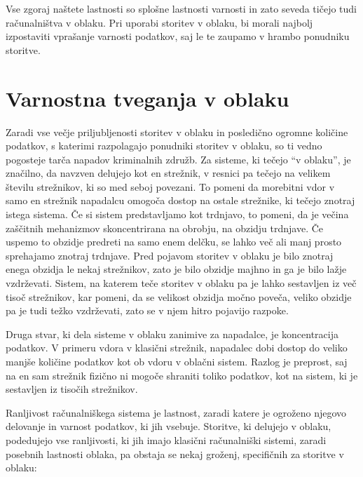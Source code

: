 \documentclass[12pt,a4paper,openany,tikz]{book}
\theoremstyle{plain}
\theoremstyle{definition}
\begin{document}
\noindent
Vse zgoraj naštete lastnosti so splošne lastnosti varnosti in zato seveda tičejo tudi računalništva v oblaku. Pri uporabi storitev v oblaku, bi morali najbolj izpostaviti vprašanje varnosti podatkov, saj le te zaupamo v hrambo ponudniku storitve.

\cleardoublepage
\chapter{Varnostna tveganja v oblaku}

Zaradi vse večje priljubljenosti storitev v oblaku in posledično ogromne količine podatkov, s katerimi razpolagajo ponudniki storitev v oblaku, so ti vedno pogosteje tarča napadov kriminalnih združb. Za sisteme, ki tečejo “v oblaku”, je značilno, da navzven delujejo kot en strežnik, v resnici pa tečejo na velikem številu strežnikov, ki so med seboj povezani. To pomeni da morebitni vdor v samo en strežnik napadalcu omogoča dostop na ostale strežnike, ki tečejo znotraj istega sistema. Če si sistem predstavljamo kot trdnjavo, to pomeni, da je večina zaščitnih mehanizmov skoncentrirana na obrobju, na obzidju trdnjave. Če uspemo to obzidje predreti na samo enem delčku, se lahko več ali manj prosto sprehajamo znotraj trdnjave. Pred pojavom storitev v oblaku je bilo znotraj enega obzidja le nekaj strežnikov, zato je bilo obzidje majhno in ga je bilo lažje vzdrževati. Sistem, na katerem teče storitev v oblaku pa je lahko sestavljen iz več tisoč strežnikov, kar pomeni, da se velikost obzidja močno poveča, veliko obzidje pa je tudi težko vzdrževati, zato se v njem hitro pojavijo razpoke.

Druga stvar, ki dela sisteme v oblaku zanimive za napadalce, je koncentracija podatkov. V primeru vdora v klasični strežnik, napadalec dobi dostop do veliko manjše količine podatkov kot ob vdoru v oblačni sistem. Razlog je preprost, saj na en sam strežnik fizično ni mogoče shraniti toliko podatkov, kot na sistem, ki je sestavljen iz tisočih strežnikov.

Ranljivost računalniškega sistema je lastnost, zaradi katere je ogroženo njegovo delovanje in varnost podatkov, ki jih vsebuje. Storitve, ki delujejo v oblaku,  podedujejo vse ranljivosti, ki jih imajo klasični računalniški sistemi, zaradi posebnih lastnosti oblaka, pa obstaja se nekaj groženj, specifičnih za storitve v oblaku:
\end{document}
